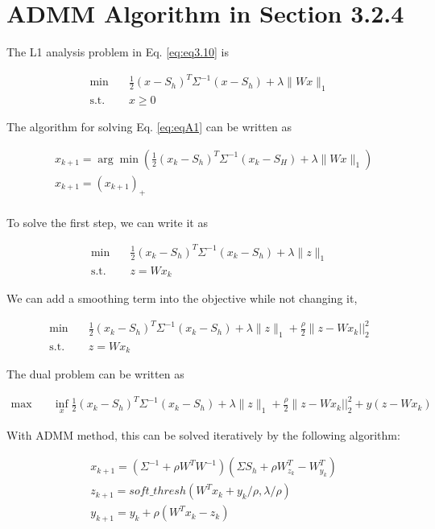 \appendix
\chapter{ADMM Algorithm in Section 3.2.4} \label{App:AppendixA}

The L1 analysis problem in Eq. \eqref{eq:eq3.10} is

\begin{align}\label{eq:eqA1}
\min \quad &
\frac{1}{2}(x-S_{h})^{T}\Sigma^{-1}(x-S_{h})+\lambda \| Wx  \|_{1} \nonumber\\
\text{s.t.} \quad & x\geq0
\end{align}


The algorithm for solving Eq. \eqref{eq:eqA1} can be written as

\begin{align*}
& x_{k+1} = \arg\min( \frac{1}{2}(x_{k} - S_{h})^{T} \Sigma^{-1} (x_{k} - S_{H}) + \lambda \|Wx\|_{1})\\
& x_{k+1} = (x_{k+1})_{+} \\
\end{align*}

To solve the first step, we can write it as

\begin{align}\label{eq:eqA2}
\min \quad &
\frac{1}{2}(x_{k}-S_{h})^{T}\Sigma^{-1}(x_{k}-S_{h})+\lambda \| z  \|_{1} \nonumber\\
\text{s.t.} \quad & z = Wx_{k}
\end{align}

We can add a smoothing term into the objective while not changing it,

\begin{align}\label{eq:eqA3}
\min \quad &
\frac{1}{2}(x_{k}-S_{h})^{T}\Sigma^{-1}(x_{k}-S_{h})+\lambda \| z  \|_{1} + \frac{\rho}{2} \| z-Wx_{k}||_{2}^{2} \nonumber\\
\text{s.t.} \quad & z = Wx_{k}
\end{align}

The dual problem can be written as

\begin{align}\label{eq:eqA4}
\max \quad &
\inf_{x} \frac{1}{2}(x_{k}-S_{h})^{T}\Sigma^{-1}(x_{k}-S_{h})+\lambda \| z  \|_{1} + \frac{\rho}{2} \| z-Wx_{k}||_{2}^{2} + y(z - Wx_{k})
\end{align}

With ADMM method, this can be solved iteratively by the following algorithm:

\begin{align*}
& x_{k+1} = (\Sigma^{-1} + \rho W^{T}W^{-1})(\Sigma S_{h} + \rho W^{T}_{z_{k}} - W^{T}_{y_{k}}) \\
& z_{k+1} = soft\_thresh(W^{T}x_{k} + y_{k} / \rho, \lambda / \rho) \\
& y_{k+1} = y_{k} + \rho (W^T x_{k} - z_{k})
\end{align*}

